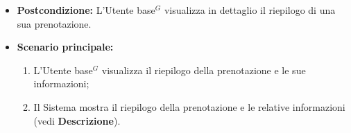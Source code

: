 \begin{itemize}
	\item \textbf{Postcondizione:}
	      L'\gls{Utente base}$^G$ visualizza in dettaglio il riepilogo di una sua prenotazione.

	\item \textbf{Scenario principale:}
	      \begin{enumerate}
		      \item L'\gls{Utente base}$^G$ visualizza il riepilogo della prenotazione e le sue informazioni;
		      \item Il Sistema mostra il riepilogo della prenotazione e le relative informazioni (vedi \textbf{Descrizione}).
	      \end{enumerate}
\end{itemize}
